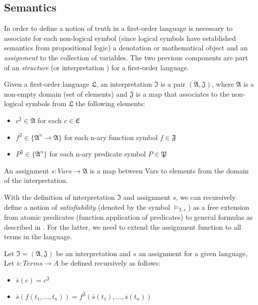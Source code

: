 \subsection{Semantics}

In order to define a notion of truth in a first-order language is necessary to associate for each non-logical symbol (since logical symbols have established semantics from propositional logic) a denotation or mathematical object and an \emph{assignment} to the collection of variables. The two previous components are part of an \emph{structure} \cite{DBLP:books/daglib/0076838} (or interpretation \cite{DBLP:books/daglib/0080654}) for a first-order language.

\begin{definition}
  Given a first-order language $\mathfrak{L}$, an interpretation $\mathfrak{I}$ is a pair $(\mathfrak{A}, \mathfrak{J})$, where $\mathfrak{A}$ is a non-empty domain (set of elements) and $\mathfrak{J}$ is a map that associates to the non-logical symbols from $\mathfrak{L}$ the following elements:
  \begin{itemize}
    \item $c^{\mathfrak{J}} \in \mathfrak{A}$ for each $c \in \mathfrak{C}$
    \item $f^{\mathfrak{J}} \in \{\mathfrak{A}^n \rightarrow \mathfrak{A}\}$ for each n-ary function symbol $f \in \mathfrak{F}$
    \item $P^{\mathfrak{J}} \in \{\mathfrak{A}^n\}$ for each n-ary predicate symbol $P \in \mathfrak{P}$
  \end{itemize}
  An assignment $s : Vars \rightarrow \mathfrak{A}$ is a map between Vars to elements from the domain of the interpretation.
\end{definition}

With the definition of interpretation $\mathfrak{I}$ and assignment $s$, we can recursively define a notion of \emph{satisfiability} (denoted by the symbol $\models_{\mathfrak{I}, s} $) as a free extension from atomic predicates (function application of predicates) to general formulas as described in \cite{DBLP:books/daglib/0076838}. For the latter, we need to extend the assignment function to all terms in the language.

\begin{definition}
  Let $\mathfrak{I} = (\mathfrak{A}, \mathfrak{J})$ be an interpretation and $s$ an assignment for a given language,
  Let $\bar{s} : Terms \rightarrow A$ be defined recursively as follows:
  \begin{itemize}
    \item $\bar{s}(c) = c^\mathfrak{J}$
    \item $\bar{s}(f(t_1, \dots, t_n)) = f^\mathfrak{J}(\bar{s}(t_1), \dots, \bar{s}(t_n))$
  \end{itemize}
\end{definition}

